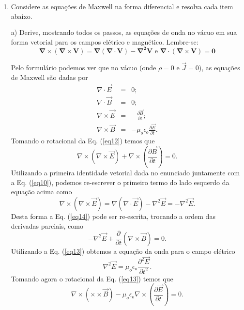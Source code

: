 \begin{enumerate}[start=1,label={\bfseries Q\arabic*.}]
\item Considere as equações de Maxwell na forma diferencial e resolva cada item abaixo.


a) Derive, mostrando todos os passos, as equações de onda no vácuo em sua forma vetorial para os campos elétrico e magnético. Lembre-se:
$$
\boldsymbol{ \nabla \times (\nabla \times V) = \nabla ( \nabla \cdot V ) - \nabla^{2} V } \mbox{ e  } \boldsymbol{ \nabla \cdot (\nabla \times V) = 0}
$$

\resposta Pelo formulário podemos ver que no vácuo (onde $\rho = 0$ e $\vec{J} = 0$), as equações de Maxwell são dadas por
%
\begin{eqnarray}
  \nabla \cdot \vec{E} &=& 0; \label{eq10} \\
  \nabla \cdot \vec{B} &=& 0; \label{eq11} \\
  \nabla \times \vec{E} &=& - \frac{\partial \vec{B}}{\partial t}; \label{eq12} \\
  \nabla \times \vec{B} &=& - \mu_{o} \epsilon_{o} \frac{\partial \vec{E}}{\partial t} . \label{eq13}
\end{eqnarray}
%
Tomando o rotacional da Eq. (\ref{eq12}) temos que
%
\begin{equation}\label{eq14}
  \nabla \times (\nabla \times \vec{E}) + \nabla \times \left( \frac{\partial \vec{B}}{\partial t}  \right) = 0 .
\end{equation}
%
Utilizando a primeira identidade vetorial dada no enunciado juntamente com a Eq. (\ref{eq10}), podemos re-escrever o primeiro termo do lado esquerdo da equação acima como
%
\begin{equation}
  \nabla \times (\nabla \times \vec{E}) = \nabla (\nabla \cdot \vec{E}) - \nabla^{2} \vec{E} = - \nabla^{2} \vec{E} .
\end{equation}
%
Desta forma a Eq. (\ref{eq14}) pode ser re-escrita, trocando a ordem das derivadas parciais, como
%
\begin{equation}
  -  \nabla^{2} \vec{E} + \frac{\partial}{\partial t} (\nabla \times \vec{B}) = 0 .
\end{equation}
%
Utilizando a Eq. (\ref{eq13}) obtemos a equação da onda para o campo elétrico
%
\begin{equation}
  \nabla^{2} \vec{E} = \mu_{o} \epsilon_{o} \frac{\partial^{2} \vec{E}}{\partial t^{2}} .
\end{equation}
%
Tomando agora o rotacional da Eq. (\ref{eq13}) temos que
%
\begin{equation}
  \nabla \times (\times \times \vec{B}) - \mu_{o} \epsilon_{o} \nabla \times \left( \frac{\partial \vec{E} }{\partial t}  \right) = 0 .

\end{equation}
\end{enumerate}
